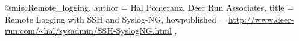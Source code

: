 @misc{Remote_logging,
  author = {Hal Pomeranz, Deer Run Associates},
  title = {Remote Logging with SSH and Syslog-NG},
  howpublished = {\url{http://www.deer-run.com/~hal/sysadmin/SSH-SyslogNG.html}}
},